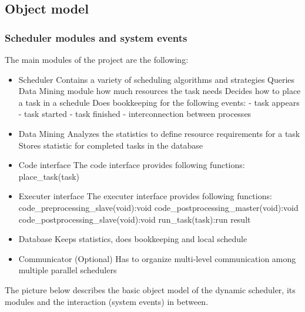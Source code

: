 \newpage


\newpage
\subsection{Object model}

\vspace{0.5cm}
\subsubsection{Scheduler modules and system events}
\vspace{0.5cm}
The main modules of the project are the following:
\begin{itemize}
	\item Scheduler
		\subitem Contains a variety of scheduling algorithms and strategies
		\subitem Queries Data Mining module how much resources the task needs
		\subitem Decides how to place a task in a schedule
		\subitem Does bookkeeping for the following events:
			\subsubitem - task appears
			\subsubitem - task started
			\subsubitem - task finished
			\subsubitem - interconnection between processes
	\item Data Mining
		\subitem Analyzes the statistics to define resource requirements for a task
		\subitem Stores statistic for completed tasks in the database
	
	\item Code interface
		\subitem The code interface provides following functions:
			\subsubitem place\_task(task)
			
	\item Executer interface
		\subitem The executer interface provides following functions:
			\subsubitem code\_preprocessing\_slave(void):void
			\subsubitem code\_postprocessing\_master(void):void
			\subsubitem code\_postprocessing\_slave(void):void
			\subsubitem run\_task(task):run result
	
	\item Database
		\subitem Keeps statistics, does bookkeeping and local schedule
		
	\item Communicator (Optional)
		\subitem Has to organize multi-level communication among multiple parallel schedulers
\end{itemize}
\vspace{1cm}
The picture below describes the basic object model of the dynamic scheduler, its modules and the interaction (system events) in between.

